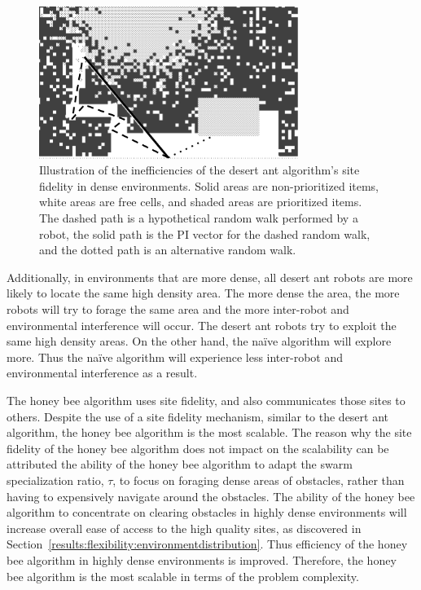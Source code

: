 \documentclass[preprint,12pt]{elsarticle}
\begin{document}
\begin{figure}[htb]
    \centering
    \includegraphics[width=0.75\textwidth]{figures/problem-scalability-desertant2.png}
    \caption{Illustration of the inefficiencies of the desert ant algorithm's site fidelity in dense environments. Solid areas are non-prioritized items, white areas are free cells, and shaded areas are prioritized items. The dashed path is a hypothetical random walk performed by a robot, the solid path is the PI vector for the dashed random walk, and the dotted path is an alternative random walk.}
    \label{fig:desertantsitefidelity}
\end{figure}

Additionally, in environments that are more dense, all desert ant robots are more likely to locate the same high density area. The more dense the area, the more robots will try to forage the same area and the more inter-robot and environmental interference will occur. The desert ant robots try to exploit the same high density areas. On the other hand, the na\"ive algorithm will explore more. Thus the na\"ive algorithm will experience less inter-robot and environmental interference as a result. 


The honey bee algorithm uses site fidelity, and also communicates those sites to others. Despite the use of a site fidelity mechanism, similar to the desert ant algorithm, the honey bee algorithm is the most scalable. The reason why the site fidelity of the honey bee algorithm does not impact on the scalability can be attributed the ability of the honey bee algorithm to adapt the swarm specialization ratio, $\tau$, to focus on foraging dense areas of obstacles, rather than having to expensively navigate around the obstacles. The ability of the honey bee algorithm to concentrate on clearing obstacles in highly dense environments will increase overall ease of access to the high quality sites, as discovered in Section~\ref{results:flexibility:environmentdistribution}. Thus efficiency of the honey bee algorithm in highly dense environments is improved. Therefore, the honey bee algorithm is the most scalable in terms of the problem complexity.
\end{document}
